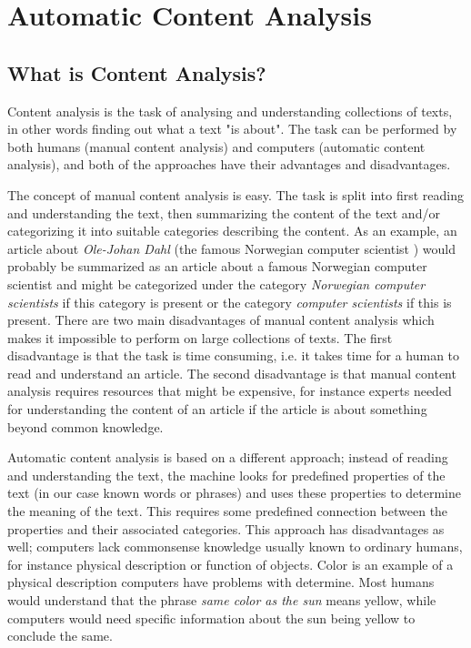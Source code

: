 \section{Automatic Content Analysis}
\label{sec:automatic_content_analysis}

\subsection{What is Content Analysis?}
Content analysis is the task of analysing and understanding collections of texts, in other words finding out what a text "is about". The task can be performed by both humans (manual content analysis) and computers (automatic content analysis), and both of the approaches have their advantages and disadvantages.

The concept of manual content analysis is easy. The task is split into first reading and understanding the text, then summarizing the content of the text and/or categorizing it into suitable categories describing the content. As an example, an article about \emph{Ole-Johan Dahl} (the famous Norwegian computer scientist \cite{Olejohandahleng}) would probably be summarized as an article about a famous Norwegian computer scientist and might be categorized under the category \emph{Norwegian computer scientists} if this category is present or the category \emph{computer scientists} if this is present.  
There are two main disadvantages of manual content analysis which makes it impossible to perform on large collections of texts. The first disadvantage is that the task is time consuming, i.e. it takes time for a human to read and understand an article. The second disadvantage is that manual content analysis requires resources that might be expensive, for instance experts needed for understanding the content of an article if the article is about something beyond common knowledge.

Automatic content analysis is based on a different approach; instead of reading and understanding the text, the machine looks for predefined properties of the text (in our case known words or phrases) and uses these properties to determine the meaning of the text. This requires some predefined connection between the properties and their associated categories. This approach has disadvantages as well; computers lack commonsense knowledge usually known to ordinary humans, for instance physical description or function of objects. %
Color is an example of a physical description computers have problems with determine. Most humans would understand that the phrase \emph{same color as the sun} means yellow, while computers would need specific information about the sun being yellow to conclude the same. 

